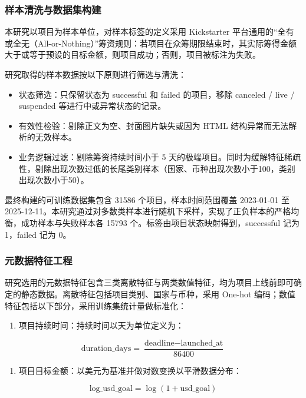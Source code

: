 \subsubsection{样本清洗与数据集构建}

本研究以项目为样本单位，对样本标签的定义采用 Kickstarter 平台通用的``全有或全无（All-or-Nothing）''筹资规则：若项目在众筹期限结束时，其实际筹得金额大于或等于预设的目标金额，则项目成功；否则，项目被标注为失败。

研究取得的样本数据按以下原则进行筛选与清洗：

\begin{itemize}
\item
  状态筛选：只保留状态为 successful 和 failed 的项目，移除 canceled / live / suspended 等进行中或异常状态的记录。
\item
  有效性检验：剔除正文为空、封面图片缺失或因为 HTML 结构异常而无法解析的无效样本。
\item
  业务逻辑过滤：剔除筹资持续时间小于 5 天的极端项目。同时为缓解特征稀疏性，剔除出现次数过低的长尾类别样本（国家、币种出现次数小于100，类别出现次数小于50）。
\end{itemize}

最终构建的可训练数据集包含 31586 个项目，样本时间范围覆盖 2023-01-01 至 2025-12-11。本研究通过对多数类样本进行随机下采样，实现了正负样本的严格均衡，成功样本与失败样本各 15793 个。标签由项目状态映射得到，successful 记为 1，failed 记为 0。

\subsubsection{元数据特征工程}

研究选用的元数据特征包含三类离散特征与两类数值特征，均为项目上线前即可确定的静态数据。离散特征包括项目类别、国家与币种，采用 One-hot 编码；数值特征包括以下部分，采用训练集统计量做标准化：

\begin{enumerate}
\def\labelenumi{(\arabic{enumi})}
\item
  项目持续时间：持续时间以天为单位定义为：
\end{enumerate}
\begin{equation}
\text{duration\_days}=\frac{\text{deadline}-\text{launched\_at}}{86400}
\end{equation}
\begin{enumerate}
\def\labelenumi{(\arabic{enumi})}
\setcounter{enumi}{1}
\item
  项目目标金额：以美元为基准并做对数变换以平滑数据分布：
\end{enumerate}
\begin{equation}
\text{log\_usd\_goal}=\log(1+\text{usd\_goal})
\end{equation}

